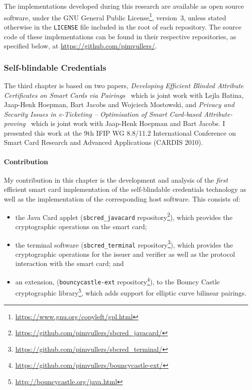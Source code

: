 The implementations developed during this research are available as open source
software, under the GNU General Public
License\footnote{\url{https://www.gnu.org/copyleft/gpl.html}}, version~3,
unless stated otherwise in the \texttt{LICENSE} file included in the root of
each repository. The source code of these implementations can be found in their
respective repositories, as specified below, at \url{https://github.com/pimvullers/}.

\subsubsection{Self-blindable Credentials}

The third chapter is based on two papers, \emph{Developing Efficient Blinded
Attribute Certificates on Smart Cards via Pairings}~\cite{BatinaHJMV10} which
is joint work with Lejla Batina, Jaap-Henk Hoepman, Bart Jacobs and Wojciech
Mostowski, and \emph{Privacy and Security Issues in e-Ticketing -- Optimisation
of Smart Card-based Attribute-proving}~\cite{HoepmanJV10} which is joint work
with Jaap-Henk Hoepman and Bart Jacobs. I presented this work at the 9th IFIP WG
8.8/11.2 International Conference on Smart Card Research and Advanced
Applications (CARDIS 2010).

\paragraph{Contribution}

My contribution in this chapter is the development and analysis of the
\emph{first} efficient smart card implementation of the self-blindable
credentials technology as well as the implementation of the corresponding host
software. This consists of:
\begin{itemize}
  \item the Java Card applet (\texttt{sbcred\_javacard} repository\footnote{%
    \url{https://github.com/pimvullers/sbcred_javacard/}}),
    which provides the cryptographic operations on the smart card;
  \item the terminal software (\texttt{sbcred\_terminal} repository\footnote{%
    \url{https://github.com/pimvullers/sbcred_terminal/}}),
    which provides the cryptographic operations for the issuer and verifier as
    well as the protocol interaction with the smart card; and
  \item an extension, (\texttt{bouncycastle-ext} repository\footnote{%
    \url{https://github.com/pimvullers/bouncycastle-ext/}}),
    to the Bouncy Castle cryptographic library\footnote{%
    \url{http://bouncycastle.org/java.html}}, which adds support for elliptic
    curve bilinear pairings.
\end{itemize}

